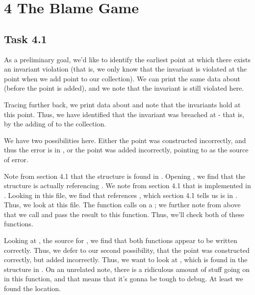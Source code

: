 \documentclass[11pt]{article}
\begin{document}
\section*{4 The Blame Game}
    \subsection*{Task 4.1}
        As a preliminary goal, we'd like to identify the earliest point at which
        there exists an invariant violation (that is, we only know that the 
        invariant is violated at the point when we add point  to our
        collection). We can print the same data about  (before the
        point is added), and we note that the invariant is still violated here.
        
        Tracing further back, we print data about  and note that the
        invariants hold at this point. Thus, we have identified that the invariant
        was breached at  - that is, by the adding of  to
        the collection.
        
        We have two possibilities here. Either the point was constructed incorrectly,
        and thus the error is in , or the point was added incorrectly,
        pointing to  as the source
        of error.
        
        Note from section 4.1 that the structure  is found in .
        Opening , we find that the structure 
        is actually referencing . We note from section 4.1 that
         is implemented in . Looking in this
        file, we find that  references , which section 4.1
        tells us is in . Thus, we look at this file. The function
         calls  on a ;
        we further note from above that we call  and pass
        the result to this function. Thus, we'll check both of these functions.
        
        Looking at , the source for , we find that
        both functions appear to be written correctly. Thus, we defer to our 
        second possibility, that the point was constructed correctly, but added
        incorrectly. Thus, we want to look at , which is found
        in the structure  in . On an unrelated note,
        there is a ridiculous amount of stuff going on in this function, and that
        means that it's gonna be tough to debug. At least we found the location.
        
\end{document}
